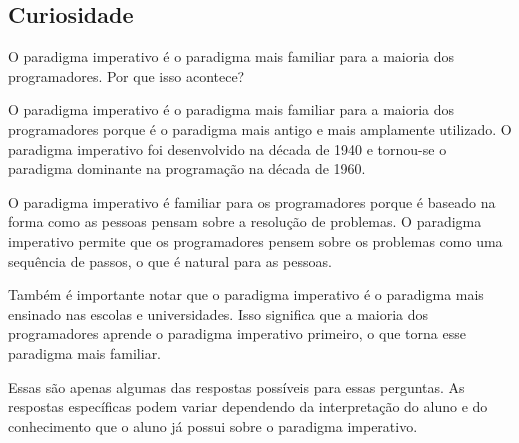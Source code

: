 \subsection{Curiosidade}
O paradigma imperativo é o paradigma mais familiar para a maioria dos programadores. Por que isso acontece?

O paradigma imperativo é o paradigma mais familiar para a maioria dos programadores porque é o paradigma mais antigo e mais amplamente utilizado. O paradigma imperativo foi desenvolvido na década de 1940 e tornou-se o paradigma dominante na programação na década de 1960.

O paradigma imperativo é familiar para os programadores porque é baseado na forma como as pessoas pensam sobre a resolução de problemas. O paradigma imperativo permite que os programadores pensem sobre os problemas como uma sequência de passos, o que é natural para as pessoas.

Também é importante notar que o paradigma imperativo é o paradigma mais ensinado nas escolas e universidades. Isso significa que a maioria dos programadores aprende o paradigma imperativo primeiro, o que torna esse paradigma mais familiar.

Essas são apenas algumas das respostas possíveis para essas perguntas. As respostas específicas podem variar dependendo da interpretação do aluno e do conhecimento que o aluno já possui sobre o paradigma imperativo.